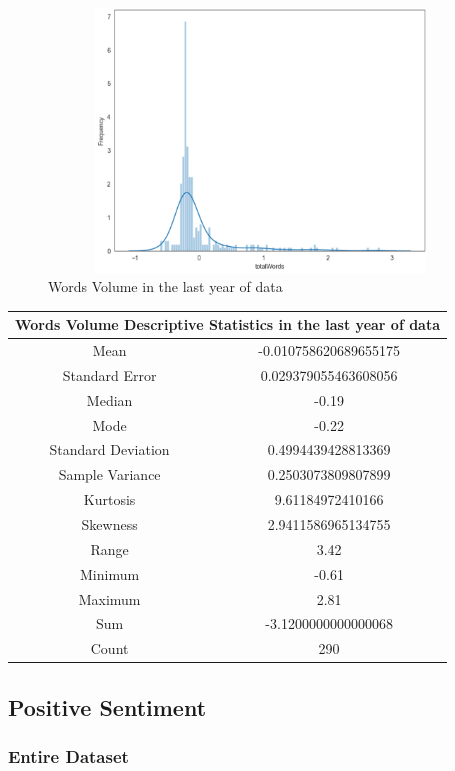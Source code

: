 \begin{figure}[h!]
    \centering
    \includegraphics[width=15cm,height=7cm,keepaspectratio]{resultsEvaluation/wordsDesc1.png}
    \caption{Words Volume in the last year of data}
    \label{fig:appendix_wordsDesc1}
\end{figure}
\begin{center}
\begin{tabular}{ c c }
\hline
\multicolumn{2}{|c|}{Words Volume Descriptive Statistics in the last year of data} \\
\hline
Mean & -0.010758620689655175 \\
Standard Error & 0.029379055463608056 \\
Median & -0.19 \\
Mode & -0.22 \\
Standard Deviation & 0.4994439428813369 \\
Sample Variance & 0.2503073809807899 \\
Kurtosis & 9.61184972410166 \\
Skewness & 2.9411586965134755 \\
Range & 3.42 \\
Minimum & -0.61 \\
Maximum & 2.81 \\
Sum & -3.1200000000000068 \\
Count & 290
\end{tabular}
\end{center}

\subsection{Positive Sentiment}

\subsubsection{Entire Dataset}

